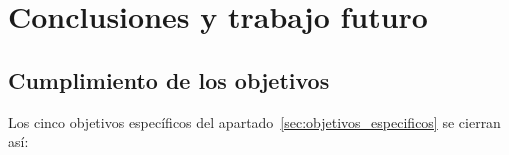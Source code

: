 \chapter{Conclusiones y trabajo futuro}
\label{cap:conclusiones}

%
%

\section{Cumplimiento de los objetivos}
\label{sec:cumplimiento}

Los cinco objetivos específicos del apartado~\ref{sec:objetivos_especificos} se cierran así:

